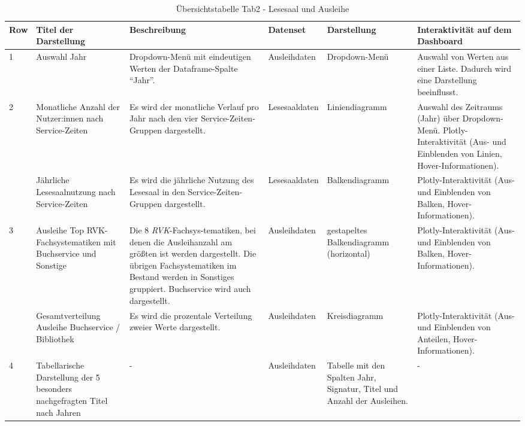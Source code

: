 \clearpage
{}
\recalctypearea  

    \begingroup
    \setlength{\tabcolsep}{12pt} %
    \renewcommand{\arraystretch}{1.5} 
    \begin{table}[h]
        \LARGE
        \centering
        \begin{adjustbox}{max width=\textwidth}
        \begin{tabular}{p{}p{}p{}p{}p{}p{}}
           \toprule
           Row        &Titel der Darstellung&Beschreibung &Datenset &Darstellung &Interaktivität auf dem Dashboard\\
           \midrule
            1           &Auswahl  Jahr &Dropdown-Menü mit eindeutigen Werten der Dataframe-Spalte \enquote{Jahr}.&Ausleihdaten&Dropdown-Menü &Auswahl von Werten aus einer Liste. Dadurch wird eine Darstellung beeinflusst.\\
           \midrule
            2           &Monatliche Anzahl der Nutzer:innen nach Service-Zeiten&Es wird der monatliche Verlauf pro Jahr nach den vier Service-Zeiten-Gruppen dargestellt.&Lesesaaldaten&Liniendiagramm&Auswahl des Zeitraums (Jahr) über Dropdown-Menü. Plotly-Interaktivität (Aus- und Einblenden von Linien, Hover-Informationen).\\
                        &Jährliche Lesesaalnutzung nach Service-Zeiten&Es wird die jährliche Nutzung des Lesesaal in den Service-Zeiten-Gruppen dargestellt.&Lesesaaldaten&Balkendiagramm    &Plotly-Interaktivität (Aus- und Einblenden von Balken, Hover-Informationen).\\          
            \midrule
            3           &Ausleihe Top RVK-Fachsystematiken mit Buchservice und Sonstige&Die 8 \textit{\acrshort{RVK}}-Fachsys-tematiken, bei denen die Ausleihanzahl am größten ist werden dargestellt. Die übrigen Fachsystematiken im Bestand werden in Sonstiges gruppiert. Buchservice wird auch dargestellt.&Ausleihdaten&gestapeltes Balkendiagramm (horizontal)&Plotly-Interaktivität (Aus- und Einblenden von Balken, Hover-Informationen).\\
                        &Gesamtverteilung Ausleihe Buchservice / Bibliothek&Es wird die prozentale Verteilung zweier Werte dargestellt.&Ausleihdaten    &Kreisdiagramm   &Plotly-Interaktivität (Aus- und Einblenden von Anteilen, Hover-Informationen).\\
            \midrule
            4           &Tabellarische Darstellung der 5 besonders nachgefragten Titel nach Jahren&-&Ausleihdaten    &Tabelle mit den Spalten Jahr, Signatur, Titel und Anzahl der Ausleihen.&-\\

        \bottomrule
        \end{tabular}
        \end{adjustbox}
        \caption{%
            Übersichtstabelle Tab2 - Lesesaal und Ausleihe
        }
        \label{tab:Darstellung Tab Lesesaal und Ausleihe}
        \end{table}
    \endgroup

